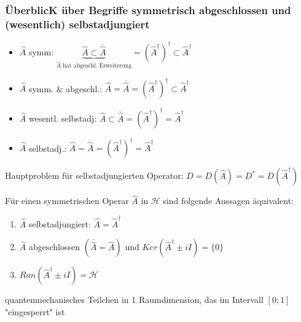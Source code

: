 \subsubsection{ÜberblicK über Begriffe symmetrisch abgeschlossen und (wesentlich) selbstadjungiert}
\begin{itemize}
    \item $\hat{A}$ symm: $\underbrace{\hat{A} \subset \overline{\hat{A}}}_{\hat{A} \textrm{ hat 
            abgeschl. Erweiterung}} = \left(\hat{A}^\dagger\right)^\dagger \subset \hat{A}^\dagger$
    \item $\hat{A}$ symm. \& abgeschl.: $\hat{A} = \overline{\hat{A}} = \left(\hat{A}^\dagger\right)^\dagger
            \subset \hat{A}^\dagger$
    \item $\hat{A}$ wesentl. selbstadj: $\hat{A} \subset \overline{\hat{A}} =
            \left(\hat{A}^\dagger\right)^\dagger = \hat{A}^\dagger$
    \item $\hat{A}$ selbstadj.: $\hat{A} = \overline{\hat{A}} = \left(\hat{A}^\dagger\right)^\dagger =
            \hat{A}^\dagger$
\end{itemize}

Hauptproblem für selbstadjungierten Operator: $D = D(\hat{A}) = D^\ast = D(\hat{A}^\dagger)$

\begin{Satz}
    Für einen symmetrischen Operar $\hat{A}$ in $\mathcal{H}$ sind folgende Aussagen äquivalent:
    \begin{enumerate}[label=(\alph*)]
        \item $\hat{A}$ selbstadjungiert: $\hat{A} = \hat{A}^\dagger$
        \item $\hat{A}$ abgeschlossen $\left( \overline{\hat{A}} = \hat{A} \right)$ und
                $Ker(\hat{A}^\dagger \pm iI) = \{0\}$
        \item $Ran(\hat{A}^\dagger \pm iI) = \mathcal{H}$
    \end{enumerate}
\end{Satz}

\begin{Bsp}{quantenmechanisches Teilchen in 1 Raumdimension, das im Intervall $[0;1]$ "eingesperrt" ist\\}

\end{Bsp}